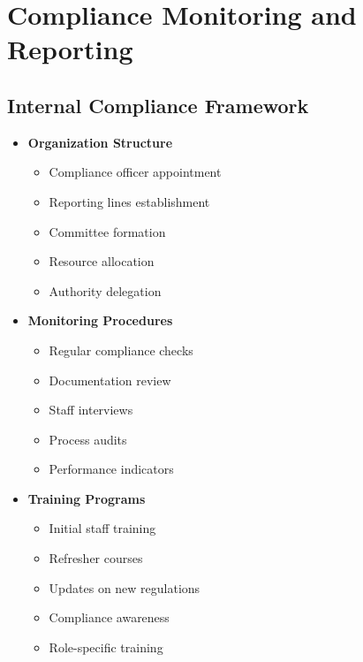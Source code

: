 \vspace{2em}


\section{Compliance Monitoring and Reporting}\label{sec:compliance-monitoring}
\vspace{1em}

\subsection{Internal Compliance Framework}\label{subsec:internal-compliance}
\vspace{1em}

\begin{tcolorbox}[
    colback=white,
    colframe=primarydark,
    title=\textbf{Compliance Management System},
    before skip=1em,
    after skip=1em
]
    \begin{itemize}[leftmargin=*,itemsep=0.5em]
        \item \textbf{Organization Structure}
        \begin{itemize}[itemsep=0.3em]
            \item Compliance officer appointment
            \item Reporting lines establishment
            \item Committee formation
            \item Resource allocation
            \item Authority delegation
        \end{itemize}

        \vspace{0.5em}

        \item \textbf{Monitoring Procedures}
        \begin{itemize}[itemsep=0.3em]
            \item Regular compliance checks
            \item Documentation review
            \item Staff interviews
            \item Process audits
            \item Performance indicators
        \end{itemize}

        \vspace{0.5em}

        \item \textbf{Training Programs}
        \begin{itemize}[itemsep=0.3em]
            \item Initial staff training
            \item Refresher courses
            \item Updates on new regulations
            \item Compliance awareness
            \item Role-specific training
        \end{itemize}


\end{itemize}
\end{tcolorbox}
